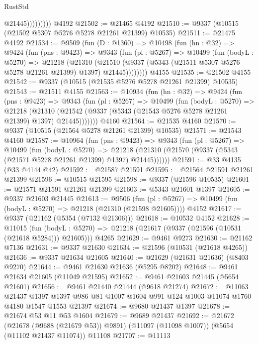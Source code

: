 \begin{lexlean}{RustStd}
\begin{coremodule}
                      @21445)))))))))
    @4192
@21502 := @21465 @4192
@21510 := @9337 (@10515 (@21502 @5307 @5276 @5278 @21261 @21399) @10535)
@21511 := @21475 @4192
@21534 := @9509
    (fun (D : @1360) =>
    @10498
      (fun (hn : @32) =>
      @9424
        (fun (pns : @9423) =>
        @9343
          (fun (pl : @5267) =>
          @10499
            (fun (bodyL : @5270) =>
            @21218
              (@21310
                (@21510 (@9337 (@5343 (@21511 @5307 @5276 @5278 @21261 @21399) @1397) @21445))))))))
    @4155
@21535 := @21502 @4155
@21542 := @9337 (@10515 (@21535 @5276 @5278 @21261 @21399) @10535)
@21543 := @21511 @4155
@21563 := @10934
    (fun (hn : @32) =>
    @9424
      (fun (pns : @9423) =>
      @9343
        (fun (pl : @5267) =>
        @10499
          (fun (bodyL : @5270) =>
          @21218
            (@21310 (@21542 (@9337 (@5343 (@21543 @5276 @5278 @21261 @21399) @1397) @21445)))))))
    @4160
@21564 := @21535 @4160
@21570 := @9337 (@10515 (@21564 @5278 @21261 @21399) @10535)
@21571 := @21543 @4160
@21587 := @10964
    (fun (pns : @9423) =>
    @9343
      (fun (pl : @5267) =>
      @10499
        (fun (bodyL : @5270) =>
        @21218 (@21310 (@21570 (@9337 (@5343 (@21571 @5278 @21261 @21399) @1397) @21445))))))
@21591 := @33 @4135 (@33 @4144 @42)
@21592 := @21587 @21591
@21595 := @21564 @21591 @21261 @21399
@21596 := @10515 @21595
@21598 := @9337 (@21596 @10535)
@21601 := @21571 @21591 @21261 @21399
@21603 := @5343 @21601 @1397
@21605 := @9337 @21603 @21445
@21613 := @9506
    (fun (pl : @5267) => @10499 (fun (bodyL : @5270) => @21218 (@21310 (@21598 @21605))))
    @4152
@21617 := @9337 (@21162 (@5354 (@7132 @21306)))
@21618 := @10532 @4152
@21628 := @11015
    (fun (bodyL : @5270) => @21218 (@21617 (@9337 (@21596 (@10531 (@21618 @5284))) @21605)))
    @4265
@21629 := @9461 @9273
@21630 := @21162 @7136
@21631 := @9337 @21630
@21634 := @21596 (@10531 (@21618 @4265))
@21636 := @9337 @21634 @21605
@21640 := @21629 (@21631 @21636) (@8403 @9270)
@21644 := @9461 @21630 @21636 (@5295 @8202)
@21648 := @9461 @21634 @21605 (@11049 @21595)
@21652 := @9461 @21603 @21445 (@5654 @21601)
@21656 := @9461 @21440 @21444 (@9618 @21274)
@21672 := @11063
    @21437
    @1397
    @1397
    @986
    @81
    @1007
    @1604
    @991
    @124
    @1003
    @11074
    @1760
    @4180
    @1547
    @1553
    @21397
@21674 := @9680 @21437 @1397
@21678 := @21674 @53 @11 @53 @1604
@21679 := @9689 @21437
@21692 := @21672
    (@21678 (@9688 (@21679 @53)) @9891)
    (@11097 (@11098 @1007))
    (@5654 (@11102 @21437 @11074))
    @11108
@21707 := @11113

\end{coremodule}
\end{lexlean}
